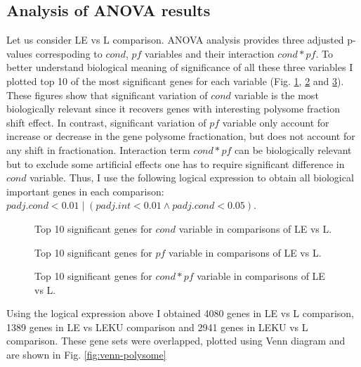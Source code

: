 \documentclass[12pt]{article} %
\begin{document}
\subsection{Analysis of ANOVA results} %
Let us consider LE vs L comparison. ANOVA analysis provides three adjusted p-values correspoding to $cond$, $pf$ variables and their interaction $cond*pf$. To better understand biological meaning of significance of all these three variables I plotted top 10 of the most significant genes for each variable (Fig. \ref{fig:polysome-L-LE-cond}, \ref{fig:polysome-L-LE-pf} and \ref{fig:polysome-L-LE-cond-pf}). These figures show that significant variation of $cond$ variable is the most biologically relevant since it recovers genes with interesting polysome fraction shift effect. In contrast, significant variation of $pf$ variable only account for increase or decrease in the gene polysome fractionation, but does not account for any shift in fractionation. Interaction term $cond*pf$ can be biologically relevant but to exclude some artificial effects one has to require significant difference in $cond$ variable. Thus, I use the following logical expression to obtain all biological important genes in each comparison: $padj.cond < 0.01 \mid (padj.int < 0.01 \land padj.cond < 0.05)$.

\begin{figure}[H] %
\caption{Top 10 significant genes for $cond$ variable in comparisons of LE vs L.}
\label{fig:polysome-L-LE-cond}
\end{figure}

\begin{figure}[H] %
\caption{Top 10 significant genes for $pf$ variable in comparisons of LE vs L.}
\label{fig:polysome-L-LE-pf}
\end{figure}

\begin{figure}[H] %
\caption{Top 10 significant genes for $cond*pf$ variable in comparisons of LE vs L.}
\label{fig:polysome-L-LE-cond-pf}
\end{figure}

Using the logical expression above I obtained 4080 genes in LE vs L comparison, 1389 genes in LE vs LEKU comparison and 2941 genes in LEKU vs L comparison. These gene sets were overlapped, plotted using Venn diagram and are shown in Fig. \ref{fig:venn-polysome}
\end{document}
